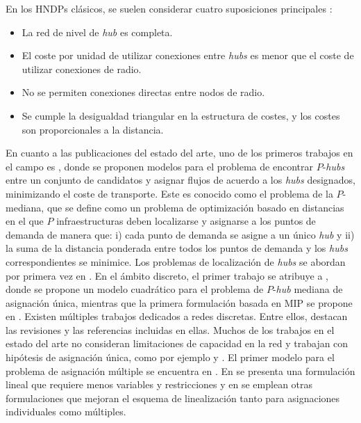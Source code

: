 En los HNDPs clásicos, se suelen considerar cuatro suposiciones principales \cite{Nickel2001}:
\begin{itemize}
    \item La red de nivel de \emph{hub} es completa.
    \item El coste por unidad de utilizar conexiones entre \emph{hubs} es menor que el coste de utilizar conexiones de radio.
    \item No se permiten conexiones directas entre nodos de radio.
    \item Se cumple la desigualdad triangular en la estructura de costes, y los costes son proporcionales a la distancia.
\end{itemize}

En cuanto a las publicaciones del estado del arte, uno de los primeros trabajos en el campo es \cite{goldman1969optimal}, donde se proponen modelos para el problema de encontrar $P$-\emph{hubs} entre un conjunto de candidatos y asignar flujos de acuerdo a los \emph{hubs} designados, minimizando el coste de
transporte. Este es conocido como el problema de la $P$-mediana, que se define como un problema de optimización basado en distancias en el que $P$ infraestructuras deben localizarse y asignarse a los puntos de demanda de manera que: i) cada punto de demanda se asigne a un único \emph{hub} y ii) la suma de la distancia ponderada entre todos los puntos de demanda y los \emph{hubs} correspondientes se minimice.
Los problemas de localización de \emph{hubs} se abordan por primera vez en \cite{o1986location,o1986activity}. En el ámbito discreto, el primer trabajo se atribuye a \cite{o1987quadratic}, donde se propone un modelo cuadrático para el problema de $P$-\emph{hub} mediana de asignación única, mientras que la primera formulación basada en MIP se propone en \cite{campbell1994integer}. Existen múltiples trabajos dedicados a redes discretas. Entre ellos, destacan las revisiones \cite{campbell2002hub,alumur2008network} y las referencias incluidas en ellas. Muchos de los trabajos en el estado del arte no consideran limitaciones de capacidad en la red y trabajan con hipótesis de asignación única, como por ejemplo \cite{skorin1996tight} y \cite{sohn1998efficient}. El primer modelo para el problema de asignación múltiple se encuentra en \cite{campbell1992location}. 
En \cite{ernst1996efficient} se presenta una formulación lineal que requiere menos variables y restricciones y en \cite{o1996hub} se emplean otras formulaciones que mejoran el esquema de linealización tanto para asignaciones individuales como múltiples. 

